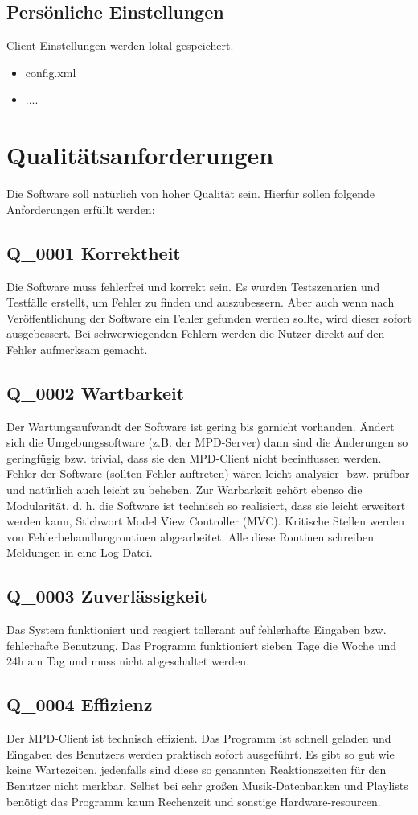 \subsection{Persönliche Einstellungen}
Client Einstellungen werden lokal gespeichert.
\begin{itemize}
	\item config.xml
	\item ....
\end{itemize}
\section{Qualitätsanforderungen}
Die Software soll natürlich von hoher Qualität sein. Hierfür sollen folgende
Anforderungen erfüllt werden:
\subsection{Q\_0001 Korrektheit}
Die Software muss fehlerfrei und korrekt sein. Es wurden Testszenarien und Testfälle erstellt,
um Fehler zu finden und auszubessern. Aber auch wenn nach Veröffentlichung der Software ein 
Fehler gefunden werden sollte, wird dieser sofort ausgebessert. Bei schwerwiegenden Fehlern
werden die Nutzer direkt auf den Fehler aufmerksam gemacht.
\subsection{Q\_0002 Wartbarkeit}
Der Wartungsaufwandt der Software ist gering bis garnicht vorhanden. Ändert sich die Umgebungssoftware
(z.B. der MPD-Server) dann sind die Änderungen so geringfügig bzw. trivial, dass sie den MPD-Client 
nicht beeinflussen werden. Fehler der Software (sollten Fehler auftreten) wären leicht analysier- bzw.
prüfbar und natürlich auch leicht zu beheben. Zur Warbarkeit gehört ebenso die Modularität, d. h.
die Software ist technisch so realisiert, dass sie leicht erweitert werden kann, Stichwort Model View
Controller (MVC). Kritische Stellen werden von Fehlerbehandlungroutinen abgearbeitet.
Alle diese Routinen schreiben Meldungen in eine Log-Datei.
\subsection{Q\_0003 Zuverlässigkeit}
Das System funktioniert und reagiert tollerant auf fehlerhafte Eingaben bzw. fehlerhafte Benutzung.
Das Programm funktioniert sieben Tage die Woche und 24h am Tag und muss nicht abgeschaltet werden.
\subsection{Q\_0004 Effizienz}
Der MPD-Client ist technisch effizient. Das Programm ist schnell geladen und Eingaben des Benutzers
werden praktisch sofort ausgeführt. Es gibt so gut wie keine Wartezeiten, jedenfalls sind diese 
so genannten Reaktionszeiten für den Benutzer nicht merkbar. Selbst bei sehr großen Musik-Datenbanken
und Playlists benötigt das Programm kaum Rechenzeit und sonstige Hardware-resourcen.
